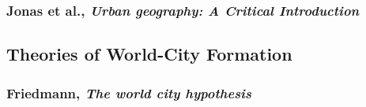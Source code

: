 \documentclass{article}
\begin{document}
\subsubsection{Jonas et al., \textit{Urban geography: A Critical Introduction}}

\begin{outline}
	\1
\end{outline}

\subsection{Theories of World-City Formation}

\subsubsection{Friedmann, \textit{The world city hypothesis}}
\end{document}
